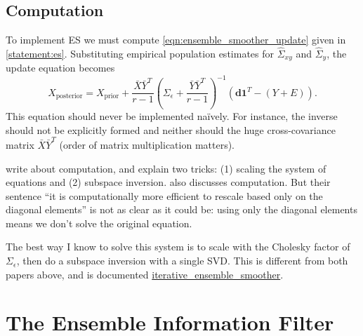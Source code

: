 \documentclass[12pt, a4paper]{article}
\theoremstyle{spaced}
\theoremstyle{spaceddef}
\numberwithin{equation}{section}
\begin{document}
\subsection{Computation}
To implement ES we must compute \cref{eqn:ensemble_smoother_update} given in \cref{statement:es}.
Substituting empirical population estimates for $\hat{\Sigma}_{xy}$ and $\hat{\Sigma}_y$, the update equation becomes
\begin{equation}
    \nonumber
    X_{\text{posterior}}
    = X_{\text{prior}} +
    \frac{\bar{X}\bar{Y}^T}{r-1}
    \left(
    \Sigma_\epsilon + \frac{\bar{Y}\bar{Y}^T}{r-1}
    \right)^{-1} \left( \bm{d} \bm{1}^T - (Y + E) \right).
\end{equation}
This equation should never be implemented naïvely.
For instance, the inverse should not be explicitly formed and neither should the huge cross-covariance matrix $\bar{X}\bar{Y}^T$ (order of matrix multiplication matters).

\citet[Appendix~A]{emerick2012esmda} write about computation, and explain two tricks: (1) scaling the system of equations and (2) subspace inversion.
\citet[Appendix~B]{emerick2016analysis} also discusses computation.
But their sentence ``it is computationally more efficient to rescale based only on the diagonal elements'' is not as clear as it could be: using only the diagonal elements means we don't solve the original equation.

The best way I know to solve this system is to scale with the Cholesky factor of $\Sigma_{\epsilon}$, then do a subspace inversion with a single SVD.
This is different from both papers above, and is documented \href{https://github.com/equinor/iterative_ensemble_smoother/blob/140522402eb13ff3df5ec51027c8faca974252ae/src/iterative_ensemble_smoother/esmda_inversion.py}{iterative\_ensemble\_smoother}.

%
%
%





\section{The Ensemble Information Filter}
\end{document}

